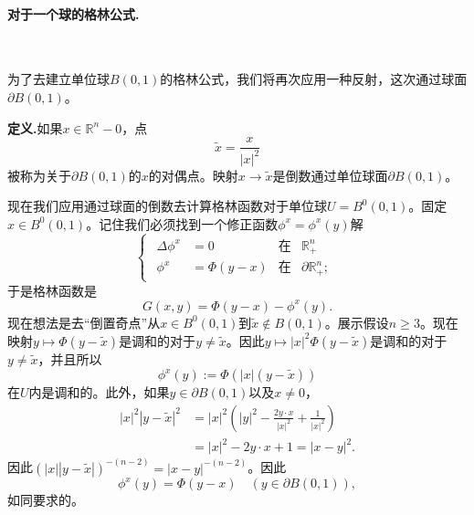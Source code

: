 \documentclass[leqno]{article}
\numberwithin{equation}{subsection}%
\begin{document}
\paragraph{对于一个球的格林公式.}~{}
\par
为了去建立单位球$B(0,1)$的格林公式，我们将再次应用一种反射，这次通过球面$\partial B(0,1)$。
\par
\noindent\textbf{定义.}如果$x\in\mathbb{R}^{n}-{0}$，点
\begin{equation*}
\tilde{x}=\frac{x}{|x|^{2}}
\end{equation*}
被称为关于$\partial B(0,1)$的$x$的对偶点。映射$x\rightarrow \tilde{x}$是倒数通过单位球面$\partial B(0,1)$。
\par
现在我们应用通过球面的倒数去计算格林函数对于单位球$U=B^{0}(0,1)$。固定$x\in B^{0}(0,1)$。记住我们必须找到一个修正函数$\phi^{x}=\phi^{x}(y)$解
\begin{equation}
\begin{cases}
\begin{aligned}
\Delta \phi^{x}&=0\qquad&\text{在}&\mathbb{R}_{+}^{n}\\
\phi^{x}&=\Phi(y-x)&\text{在}&\partial\mathbb{R}_{+}^{n};
\end{aligned}
\end{cases}
\end{equation}
于是格林函数是
\begin{equation}
G(x,y)=\Phi(y-x)-\phi^{x}(y).
\end{equation}
现在想法是去“倒置奇点”从$x\in B^{0}(0,1)$到$\tilde{x}\not\in B(0,1)$。展示假设$n\geq 3$。现在映射$y\mapsto \Phi(y-\tilde{x})$是调和的对于$y\neq\tilde{x}$。因此$y\mapsto|x|^{2}\Phi(y-\tilde{x})$是调和的对于$y\neq\tilde{x}$，并且所以
\begin{equation}
\phi^{x}(y):=\Phi(|x|(y-\tilde{x}))
\end{equation}
在$U$内是调和的。此外，如果$y\in\partial B(0,1)$以及$x\neq 0$，
\begin{equation*}
\begin{aligned}
|x|^{2}|y-\tilde{x}|^{2}&=|x|^{2}\left(|y|^{2}-\frac{2y\cdot x}{|x|^{2}}+\frac{1}{|x|^{2}}\right)\\
&=|x|^{2}-2y\cdot x+1=|x-y|^{2}.
\end{aligned}
\end{equation*}
因此$(|x||y-\tilde{x}|)^{-(n-2)}=|x-y|^{-(n-2)}$。因此
\begin{equation}
\phi^{x}(y)=\Phi(y-x)\quad(y\in\partial B(0,1)),
\end{equation}
如同要求的。
\par
\end{document}
